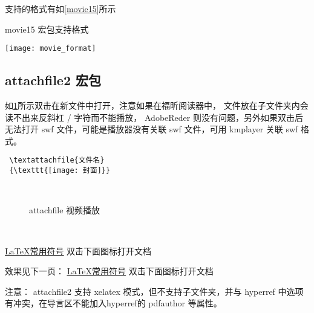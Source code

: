 支持的格式有如\ref{movie15}所示\\
\begin{table}[ht]
  \centering
   \caption{movie15 宏包支持格式}\label{movie15}
  \texttt{[image: movie\_format]}\\

\end{table}

\subsection{attachfile2 宏包}

如\ref{movie_attach}所示双击在新文件中打开，注意如果在福昕阅读器中，
文件放在子文件夹内会读不出来反斜杠 \textcolor[rgb]{1.00,0.00,0.00}{/} 字符而不能播放，
AdobeReder 则没有问题，另外如果双击后无法打开 swf 文件，可能是播放器没有关联 swf 文件，可用 kmplayer 关联 swf 格式。
 \begin{shaded}
 \begin{Verbatim}
 \textattachfile{文件名}
 {\texttt{[image: 封面]}}
 \end{Verbatim}
 \end{shaded}

\begin{figure}[ht]
  \centering
{} \\
 \caption{attachfile 视频播放}\label{movie_attach}
\end{figure}
~\\


\begin{cmd}[label=attachfile2 使用样例代码]
\hyperlink{symbols}{\color{blue}\uline{\LaTeX 常用符号}}
\hypertarget{symbols}{\textcolor[rgb]
{0.00,0.00,1.00}{双击下面图标打开文档}}
\normalcolor
~\\[0.3cm]
\begin{center}
\end{center}
\end{cmd}

效果见下一页：
\hyperlink{symbols}{\color{blue}\uline{\LaTeX 常用符号}}
\clearpage
\hypertarget{symbols}{\textcolor[rgb]
{0.00,0.00,1.00}{双击下面图标打开文档}}

\begin{center}
\end{center}

\textcolor[rgb]{1.00,0.00,0.00}{注意：
attachfile2 支持 xelatex 模式，但不支持子文件夹，并与 hyperref 中选项有冲突，在导言区不能加入hyperref的 pdfauthor 等属性。}
